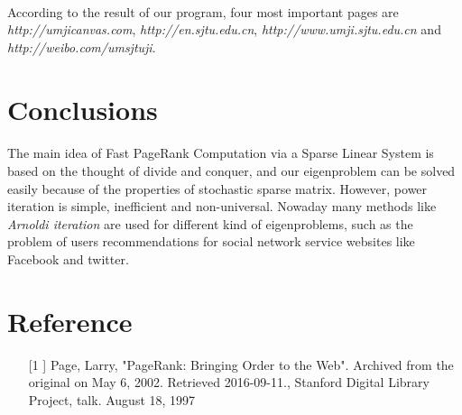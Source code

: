 \documentclass[a0,portrait]{a0poster}
\begin{document}
\begin{multicols}{2}
  \paragraph{}
  According to the result of our program, four most important pages are \textit{http://umjicanvas.com}, \textit{http://en.sjtu.edu.cn}, \textit{http://www.umji.sjtu.edu.cn} and \textit{http://weibo.com/umsjtuji}.   

\color{teal}
\section*{Conclusions}
  \paragraph{}
  The main idea of Fast PageRank Computation via a Sparse Linear System is based on the thought of divide and conquer, and our eigenproblem can be solved easily because of the properties of stochastic sparse matrix. However, power iteration is simple, inefficient and non-universal. Nowaday many methods like \textit{Arnoldi iteration} are used for different kind of eigenproblems, such as the problem of users recommendations for social network service websites like Facebook and twitter.

\color{DarkSlateGray} %




\nocite{*} %


\section*{Reference}
\begin{enumerate}
\item[[1]] Page, Larry, "PageRank: Bringing Order to the Web". 
Archived from the original on May 6, 2002. Retrieved 2016-09-11., 
Stanford Digital Library Project, talk. August 18, 1997 


\end{enumerate}
\end{multicols}
\end{document}
